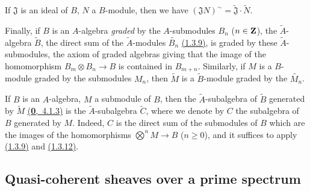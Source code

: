 \begin{env}[1.3.13]
If $\mathfrak{J}$ is an ideal of $B$, $N$ a $B$-module, then we have
$(\mathfrak{J}N)^\sim=\widetilde{\mathfrak{J}}\cdot\widetilde{N}$.

Finally, if $B$ is an $A$-algebra {\it graded} by the $A$-submodules $B_n$ ($n\in\mathbf{Z}$),
the $\widetilde{A}$-algebra $\widetilde{B}$, the direct sum of the $\widetilde{A}$-modules
$\widetilde{B_n}$ \hyperref[cor-1.1.3.9]{(1.3.9)}, is graded by these $\widetilde{A}$-submodules, the axiom
of graded algebras giving that the image of the homomorphism $B_m\otimes B_n\to B$ is
contained in $B_{m+n}$. Similarly, if $M$ is a $B$-module graded by the submodules $M_n$,
then $\widetilde{M}$ is a $\widetilde{B}$-module graded by the $\widetilde{M_n}$.
\end{env}

\begin{env}[1.3.14]
\label{env-1.1.3.14}
If $B$ is an $A$-algebra, $M$ a submodule of $B$, then the $\widetilde{A}$-subalgebra of
$\widetilde{B}$ generated by $\widetilde{M}$ \hyperref[env-0.4.1.3]{(\textbf{0},~4.1.3)} is the
$\widetilde{A}$-subalgebra $\widetilde{C}$, where we denote by $C$ the subalgebra of $B$
generated by $M$. Indeed, $C$ is the direct sum of the submodules of $B$ which are the images
of the homomorphisms $\bigotimes^n M\to B$ ($n\geqslant 0$), and it suffices to apply
\hyperref[cor-1.1.3.9]{(1.3.9)} and \hyperref[cor-1.1.3.12]{(1.3.12)}.
\end{env}

\subsection{Quasi-coherent sheaves over a prime spectrum}
\label{subsection-qcoh-sheaves-over-spec}

